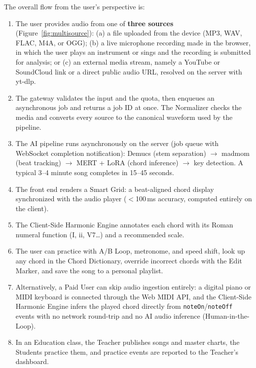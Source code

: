 \documentclass[a4paper]{article}
\begin{document}
The overall flow from the user's perspective is:
\begin{enumerate}
    \item The user provides audio from one of \textbf{three sources} (Figure~\ref{fig:multisource}): (a) a file uploaded from the device (MP3, WAV, FLAC, M4A, or OGG); (b) a live microphone recording made in the browser, in which the user plays an instrument or sings and the recording is submitted for analysis; or (c) an external media stream, namely a YouTube or SoundCloud link or a direct public audio URL, resolved on the server with yt-dlp.
    \item The gateway validates the input and the quota, then enqueues an asynchronous job and returns a job ID at once. The Normalizer checks the media and converts every source to the canonical waveform used by the pipeline.
    \item The AI pipeline runs asynchronously on the server (job queue with WebSocket completion notification): Demucs (stem separation) $\to$ madmom (beat tracking) $\to$ MERT + LoRA (chord inference) $\to$ key detection. A typical 3--4 minute song completes in 15--45 seconds.
    \item The front end renders a Smart Grid: a beat-aligned chord display synchronized with the audio player ($<$100\,ms accuracy, computed entirely on the client).
    \item The Client-Side Harmonic Engine annotates each chord with its Roman numeral function (I, ii, V7\ldots) and a recommended scale.
    \item The user can practice with A/B Loop, metronome, and speed shift, look up any chord in the Chord Dictionary, override incorrect chords with the Edit Marker, and save the song to a personal playlist.
    \item Alternatively, a Paid User can skip audio ingestion entirely: a digital piano or MIDI keyboard is connected through the Web MIDI API, and the Client-Side Harmonic Engine infers the played chord directly from \texttt{noteOn}/\texttt{noteOff} events with no network round-trip and no AI audio inference (Human-in-the-Loop).
    \item In an Education class, the Teacher publishes songs and master charts, the Students practice them, and practice events are reported to the Teacher's dashboard.
\end{enumerate}
\end{document}
